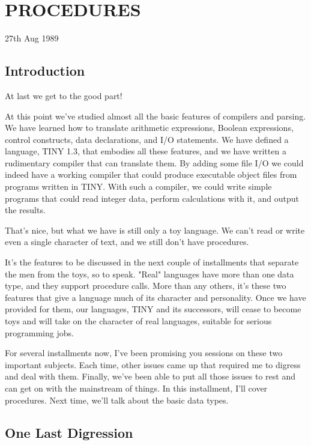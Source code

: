 
\chapter{PROCEDURES}

27th Aug 1989

\section{Introduction}

At last we get to the good part!

At  this point we've studied almost all  the  basic  features  of compilers  and  parsing. We  have  learned  how  to  translate arithmetic expressions, Boolean expressions, control  constructs, data  declarations, and  I/O  statements. We  have defined  a language, TINY 1.3, that embodies all these features, and we have written  a  rudimentary  compiler that can translate  them. By adding some file I/O we could indeed have a working compiler that could produce executable object files  from  programs  written in TINY. With such a compiler, we could write simple  programs that could read integer data, perform calculations with it, and output the results.

That's nice, but what we have is still only a  toy  language. We can't read or write even a single character of text, and we still don't have procedures.

It's  the  features  to  be  discussed  in  the  next  couple  of installments  that  separate  the men from the toys, so to speak. "Real" languages have more than one data type, and  they support procedure calls. More than any others, it's  these  two features that give a language much of its character and personality. Once we  have  provided   for   them, our  languages, TINY  and  its successors, will cease  to  become  toys  and  will  take  on the character  of  real  languages, suitable for serious programming jobs.

For several installments now, I've been promising you sessions on these  two  important  subjects. Each time, other issues came up that required me to  digress  and deal with them. Finally, we've been able to put all those issues to rest and can get on with the mainstream  of  things. In   this   installment, I'll  cover procedures. Next time, we'll talk about the basic data types.

\section{One Last Digression}

